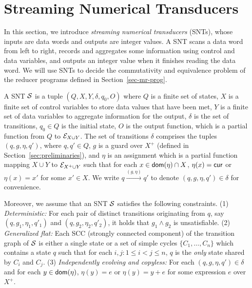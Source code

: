 


\section{Streaming Numerical Transducers}\label{sec:def-snt}

In this section, we introduce \emph{streaming numerical transducers} (SNTs), whose inputs are data words and outputs are integer values. A SNT scans a data word from left to right, records and aggregates some information using control and data variables, and outputs an integer value when it finishes reading the data word. We will use SNTs to decide the commutativity and equivalence problem of the reducer programs defined in Section~\ref{sec-mr-prog}.


A SNT ${\mathcal{S} }$ is a tuple $(Q, X, Y, \delta, q_0, O)$ where $Q$ is a finite set of states, $X$ is a finite set of control variables to store data values that have been met, $Y$ is a finite set of data variables to aggregate information for the output, $\delta$ is the set of transitions, $q_0 \in Q$ is the initial state, $O$ is the output function, which is a partial function from $Q$ to ${\mathcal{E} }_{X \cup Y}$.%
The set of transitions $\delta$ comprises the tuples $(q,  g, \eta, q')$, where $q,q'\in Q$, $g$ is a guard over $X^+$ (defined in Section~\ref{sec:preliminaries}), and $\eta$ is an assignment which is a partial function mapping $X \cup Y$  to ${\mathcal{E} }_{X^+ \cup Y}$ such that for each $x \in \mathsf{dom}(\eta) \cap X$, $\eta(x)=\mathsf{cur}$ or $\eta(x) = x'$ for some $x' \in X$. We write $q \xrightarrow{(g,\eta)} q'$ to denote $(q,g,\eta,q') \in \delta$ for convenience. 

Moreover, we assume that an SNT ${\mathcal{S} }$ satisfies the following constraints. (1) \emph{Deterministic:} For each pair of distinct transitions originating from $q$, say $(q, g_1, \eta_1,q'_1)$ and $(q, g_2,\eta_2,q'_2)$, it holds that $g_1 \wedge g_2$ is unsatisfiable. (2) \emph{Generalized flat:} Each SCC (strongly connected component) of the transition graph of ${\mathcal{S} }$ is either a single state or a set of simple cycles $\{C_1,\dots, C_n\}$ which contains a state $q$ such that for each $i,j: 1 \le i < j \le n$, $q$ is the \emph{only} state shared by $C_i$ and $C_j$. (3) \emph{Independently evolving and copyless:} For each $(q, g, \eta, q') \in \delta$ and for each $y \in \mathsf{dom}(\eta)$, $\eta(y)=e$ or $\eta(y)=y+e$ for some expression $e$ over $X^+$.


